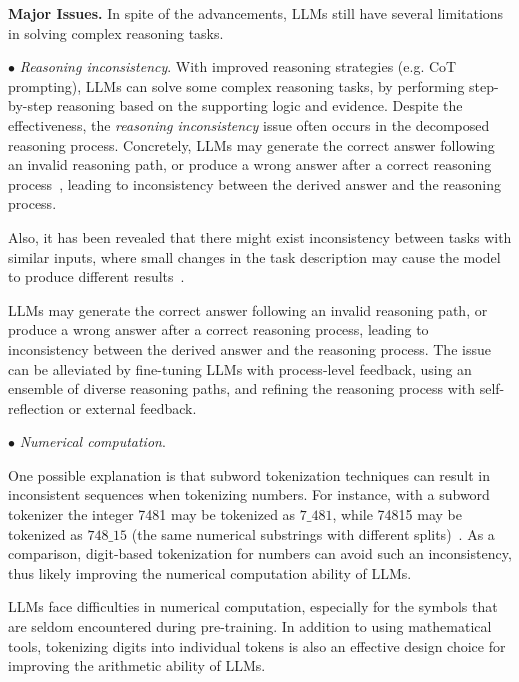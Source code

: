 {{{{\textbf{Major Issues.} In spite of the advancements, LLMs still have several limitations in solving complex reasoning tasks.

$\bullet$ \emph{Reasoning inconsistency}. With improved reasoning strategies (e.g. CoT prompting), LLMs can solve some complex reasoning tasks, by performing step-by-step reasoning based on the supporting logic and evidence. Despite the effectiveness, the  \emph{reasoning inconsistency} issue often occurs in the decomposed reasoning process. Concretely, LLMs may generate the correct answer following an invalid reasoning path, or produce a wrong answer after a correct reasoning process~\cite{Wei-arxiv-2022-chain,Lyu-arxiv-2023-Faithful}, leading to inconsistency between the derived answer and the reasoning process.

Also, it has been revealed that there might exist   inconsistency between tasks with  similar inputs, where small changes in the task description may cause the model to produce different results~\cite{Patel-NAACL-2021-Are,Lu-arxiv-2022-Survey}.

\begin{center}
\begin{tcolorbox}[colback=blue!5!white,colframe=blue!55!black,width=0.46\textwidth,title={Reasoning Inconsistency}] LLMs may generate the correct answer following an invalid reasoning path, or produce a wrong answer after a correct reasoning process, leading to inconsistency between the derived answer and the reasoning process. {The issue can be alleviated by fine-tuning LLMs with process-level  feedback,  using an ensemble of diverse reasoning paths, and refining the reasoning process with self-reflection or external feedback.}
\end{tcolorbox}
\end{center}

$\bullet$ \emph{Numerical  computation}.

{One possible explanation is that subword tokenization techniques can result in inconsistent sequences when tokenizing numbers. For instance, with a subword tokenizer the integer 7481 may be tokenized as $7\_481$, while 74815 may be tokenized as $748\_15$ (the same numerical substrings with different splits)~\cite{liu-arxiv-2023-goat}.} As a comparison, digit-based tokenization for numbers can avoid such an inconsistency, thus likely improving the numerical computation ability of LLMs. 

}

\begin{center}
\begin{tcolorbox}[colback=blue!5!white,colframe=blue!55!black,width=0.46\textwidth,title={Numerical Computation}] LLMs face difficulties in numerical computation, especially for the symbols that are seldom  encountered during pre-training. In addition to using mathematical tools, tokenizing digits into individual tokens is also an effective design choice for improving the arithmetic ability of LLMs.
\end{tcolorbox}
\end{center}

}}}
